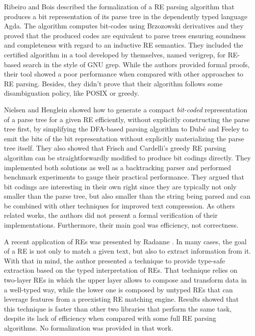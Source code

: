 \documentclass[oneside,12pt]{scrbook}
\theoremstyle{definition}
\theoremstyle{plain}
\theoremstyle{definition}
\begin{document}
Ribeiro and Bois \cite{Ribeiro2017} described the formalization of a RE parsing algorithm that produces a bit representation
of its parse tree in the dependently typed language Agda. The algorithm computes bit-codes using Brzozowski derivatives and they proved that the produced codes are equivalent to parse trees ensuring soundness and completeness with regard to an inductive RE semantics. They included the certified algorithm in a tool developed by themselves, named verigrep, for RE-based search in the style of GNU grep. While the authors provided formal proofs, their tool showed a poor performance when compared with other approaches to RE parsing. Besides, they
didn't prove that their algorithm follows some disambiguation policy, like POSIX or greedy.


Nielsen and Henglein \cite{Nielsen2011} showed how to generate a compact \textit{bit-coded} representation of a parse tree for a given RE efficiently, without explicitly constructing the parse tree first, by simplifying the DFA-based parsing algorithm to Dubé and Feeley \cite{Dube2000} to emit the bits of the bit representation without explicitly materializing the parse tree itself. They also showed that Frisch and Cardelli’s greedy RE parsing algorithm \cite{Frisch2004} can be straightforwardly modified to produce bit codings directly. They implemented both solutions as well as a backtracking parser and performed benchmark experiments to gauge their practical performance. They argued that bit codings are interesting in their own right since they are typically not only smaller than the parse tree, but also smaller than the string being parsed and can be combined with other techniques for improved text compression. As others related works, the authors did not present a formal verification of their implementations. Furthermore, their main goal was efficiency, not correctness.


A recent application of REs was presented by Radanne \cite{Radanne2019}. In many cases, the goal of a RE is not only to match a given text, but also to extract information from it. With that in mind, the author presented a technique to provide type-safe extraction based on the typed interpretation of REs. That technique relies on two-layer REs in which the upper layer allows to compose and transform data in a well-typed way, while the lower one is composed by untyped REs that can leverage features from a preexisting RE matching engine. Results showed that this technique is faster than other two libraries that perform the same task, despite its lack of efficiency when compared with some full RE parsing algorithms. No formalization was provided in that work.
\end{document}
